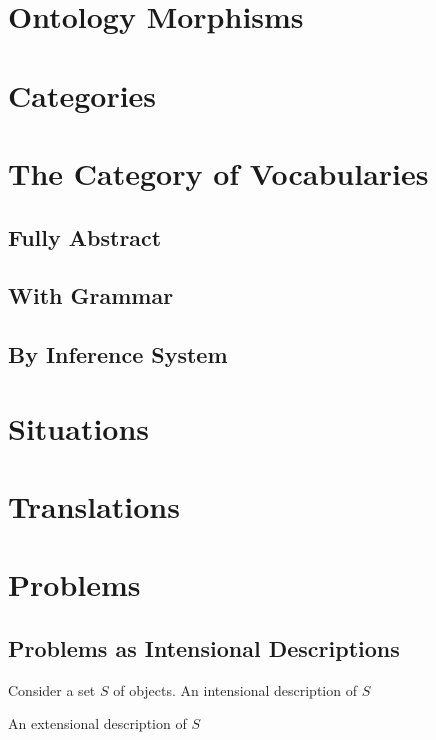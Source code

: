 \section{Ontology Morphisms}

\section{Categories}

\section{The Category of Vocabularies}

\subsection{Fully Abstract}

\subsection{With Grammar}


\subsection{By Inference System}

\section{Situations}

\section{Translations}


\section{Problems}

\subsection{Problems as Intensional Descriptions}

\begin{remark}
Consider a set $S$ of objects.
An intensional description of $S$

An extensional description of $S$
\end{remark}

